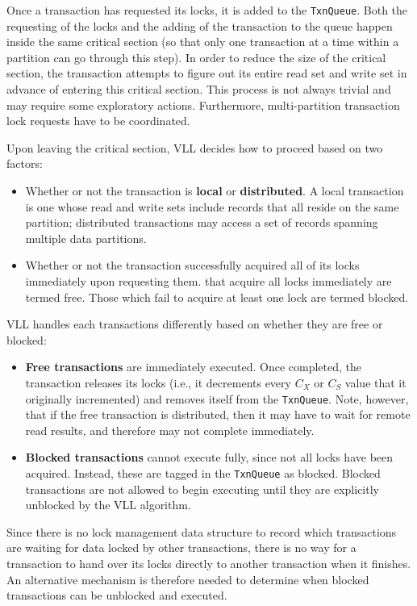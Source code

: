 \documentclass[11pt]{article}
\begin{document}
Once a transaction has requested its locks, it is added to the \texttt{TxnQueue}. Both the requesting of the
locks and the adding of the transaction to the queue happen inside the same critical section (so that
only one transaction at a time within a partition can go through this step). In order to reduce the
size of the critical section, the transaction attempts to figure out its entire read set and write set
in advance of entering this critical section. This process is not always trivial and may require some
exploratory actions. Furthermore, multi-partition transaction lock requests have to be coordinated.

Upon leaving the critical section, VLL decides how to proceed based on two factors:
\begin{itemize}
\item Whether or not the transaction is \textbf{local} or \textbf{distributed}. A local transaction is one whose read and
write sets include records that all reside on the same partition; distributed transactions may
access a set of records spanning multiple data partitions.
\item Whether or not the transaction successfully acquired all of its locks immediately upon requesting
them.  that acquire all locks immediately are termed free. Those which fail to acquire at least one
lock are termed blocked.
\end{itemize}

VLL handles each transactions differently based on whether they are free or blocked:
\begin{itemize}
\item \textbf{Free transactions} are immediately executed. Once completed, the transaction releases its locks
(i.e., it decrements every \(C_X\) or \(C_S\) value that it originally incremented) and removes
itself from the \texttt{TxnQueue}. Note, however, that if the free transaction is distributed, then it may
have to wait for remote read results, and therefore may not complete immediately.
\item \textbf{Blocked transactions} cannot execute fully, since not all locks have been acquired. Instead, these
are tagged in the \texttt{TxnQueue} as blocked. Blocked transactions are not allowed to begin executing until
they are explicitly unblocked by the VLL algorithm.
\end{itemize}


Since there is no lock management data structure to record which transactions are waiting for data
locked by other transactions, there is no way for a transaction to hand over its locks directly to
another transaction when it finishes. An alternative mechanism is therefore needed to determine when
blocked transactions can be unblocked and executed.
\end{document}
